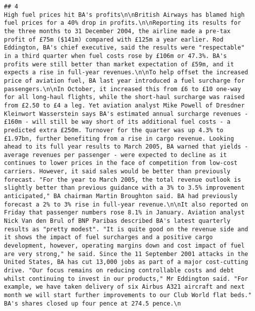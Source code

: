 \documentclass[
]{article}
\begin{document}
\begin{verbatim}
## 4                                                                                                                                                               High fuel prices hit BA's profits\n\nBritish Airways has blamed high fuel prices for a 40% drop in profits.\n\nReporting its results for the three months to 31 December 2004, the airline made a pre-tax profit of £75m ($141m) compared with £125m a year earlier. Rod Eddington, BA's chief executive, said the results were "respectable" in a third quarter when fuel costs rose by £106m or 47.3%. BA's profits were still better than market expectation of £59m, and it expects a rise in full-year revenues.\n\nTo help offset the increased price of aviation fuel, BA last year introduced a fuel surcharge for passengers.\n\nIn October, it increased this from £6 to £10 one-way for all long-haul flights, while the short-haul surcharge was raised from £2.50 to £4 a leg. Yet aviation analyst Mike Powell of Dresdner Kleinwort Wasserstein says BA's estimated annual surcharge revenues - £160m - will still be way short of its additional fuel costs - a predicted extra £250m. Turnover for the quarter was up 4.3% to £1.97bn, further benefiting from a rise in cargo revenue. Looking ahead to its full year results to March 2005, BA warned that yields - average revenues per passenger - were expected to decline as it continues to lower prices in the face of competition from low-cost carriers. However, it said sales would be better than previously forecast. "For the year to March 2005, the total revenue outlook is slightly better than previous guidance with a 3% to 3.5% improvement anticipated," BA chairman Martin Broughton said. BA had previously forecast a 2% to 3% rise in full-year revenue.\n\nIt also reported on Friday that passenger numbers rose 8.1% in January. Aviation analyst Nick Van den Brul of BNP Paribas described BA's latest quarterly results as "pretty modest". "It is quite good on the revenue side and it shows the impact of fuel surcharges and a positive cargo development, however, operating margins down and cost impact of fuel are very strong," he said. Since the 11 September 2001 attacks in the United States, BA has cut 13,000 jobs as part of a major cost-cutting drive. "Our focus remains on reducing controllable costs and debt whilst continuing to invest in our products," Mr Eddington said. "For example, we have taken delivery of six Airbus A321 aircraft and next month we will start further improvements to our Club World flat beds." BA's shares closed up four pence at 274.5 pence.\n

\end{verbatim}
\end{document}
